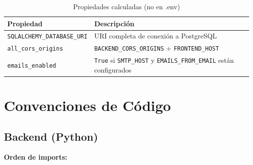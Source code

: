 \begin{longtable}[]{@{}
  >{\raggedright\arraybackslash}p{}
  >{\raggedright\arraybackslash}p{}@{}}
\caption[Propiedades calculadas (no en .env)]{Propiedades calculadas (no en .env)}\tabularnewline
\toprule\noalign{}
\begin{minipage}[b]{\linewidth}\raggedright
Propiedad
\end{minipage} & \begin{minipage}[b]{\linewidth}\raggedright
Descripción
\end{minipage} \\
\midrule\noalign{}
\endhead
\bottomrule\noalign{}
\endlastfoot
\texttt{SQLALCHEMY\_DATABASE\_URI} & URI completa de conexión a PostgreSQL \\
\texttt{all\_cors\_origins} & \texttt{BACKEND\_CORS\_ORIGINS} + \texttt{FRONTEND\_HOST} \\
\texttt{emails\_enabled} & \texttt{True} si \texttt{SMTP\_HOST} y \texttt{EMAILS\_FROM\_EMAIL} están configurados \\
\end{longtable}

\section{Convenciones de Código}\label{convenciones-de-cuxf3digo}

\subsection{Backend (Python)}\label{backend-python}

\textbf{Orden de imports:}

\begin{Shaded}
\begin{Highlighting}[]


\end{Highlighting}
\end{Shaded}

